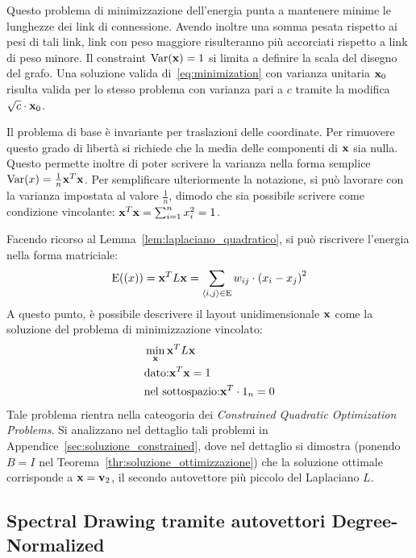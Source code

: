 \documentclass[10pt,a4paper]{article}
\newcommand{\Var}{\mathrm{Var}}
\newcommand{\E}{\mathrm{E}}
\begin{document}
Questo problema di minimizzazione dell'energia punta a mantenere minime le lunghezze dei link di connessione.
Avendo inoltre una somma pesata rispetto ai pesi di tali link, link con peso maggiore risulteranno più accorciati rispetto a link di peso minore.
Il constraint \(\Var(\vb{x}) = 1\) si limita a definire la scala del disegno del grafo. Una soluzione valida di~\eqref{eq:minimization} con varianza unitaria \(\vb{x}_0\) risulta valida per lo stesso problema con varianza pari a \(c\) tramite la modifica \(\sqrt{c}\cdot\vb{x}_0\).

Il problema di base è invariante per traslazioni delle coordinate.
Per rimuovere questo grado di libertà si richiede che la media delle componenti di \(\vb{x}\) sia nulla.
Questo permette inoltre di poter scrivere la varianza nella forma semplice \(\Var(x) = \frac{1}{n}\vb{x}^T\vb{x}\).
Per semplificare ulteriormente la notazione, si può lavorare con la varianza impostata al valore \(\frac{1}{n}\), dimodo che sia possibile scrivere come condizione vincolante: \(\vb{x}^T\vb{x} = \sum_{i=1}^n x_i^2 = 1\).

Facendo ricorso al Lemma~\ref{lem:laplaciano_quadratico}, si può riscrivere l'energia nella forma matriciale:
\begin{equation}
    \E(\vb(x)) = \vb{x}^T L\vb{x} = \sum_{\langle i,j\rangle\in \E} w_{ij}\cdot {(x_i - x_j)}^2
\end{equation}
A questo punto, è possibile descrivere il layout unidimensionale \(\vb{x}\) come la soluzione del problema di minimizzazione vincolato:
\begin{align}
    & \min_{\vb{x}} \vb{x}^T L\vb{x}\\
    & \text{dato:} \vb{x}^T\vb{x} = 1 \\
    & \text{nel sottospazio:} \vb{x}^T \cdot 1_n = 0
\end{align}
Tale problema rientra nella cateogoria dei \textit{Constrained Quadratic Optimization Problems}.
Si analizzano nel dettaglio tali problemi in Appendice~\ref{sec:soluzione_constrained}, dove nel dettaglio si dimostra (ponendo \(B=I\) nel Teorema~\ref{thr:soluzione_ottimizzazione}) che la soluzione ottimale corrisponde a \(\vb{x} = \vb{v}_2\), il secondo autovettore più piccolo del Laplaciano \(L\).

\subsection{Spectral Drawing tramite autovettori Degree-Normalized}
\end{document}
